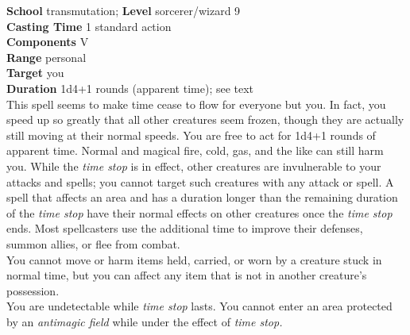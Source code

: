 \textbf{School} transmutation; \textbf{Level} sorcerer/wizard 9\\
\textbf{Casting Time} 1 standard action\\
\textbf{Components} V\\
\textbf{Range} personal\\
\textbf{Target} you\\
\textbf{Duration} 1d4+1 rounds (apparent time); see text\\
This spell seems to make time cease to flow for everyone but you. In fact, you speed up so greatly that all other creatures seem frozen, though they are actually still moving at their normal speeds. You are free to act for 1d4+1 rounds of apparent time. Normal and magical fire, cold, gas, and the like can still harm you. While the \textit{time stop }is in effect, other creatures are invulnerable to your attacks and spells; you cannot target such creatures with any attack or spell. A spell that affects an area and has a duration longer than the remaining duration of the \textit{time stop} have their normal effects on other creatures once the \textit{time stop }ends. Most spellcasters use the additional time to improve their defenses, summon allies, or flee from combat.\\
You cannot move or harm items held, carried, or worn by a creature stuck in normal time, but you can affect any item that is not in another creature's possession.\\
You are undetectable while \textit{time stop }lasts. You cannot enter an area protected by an \textit{antimagic field }while under the effect of \textit{time stop.}\\
